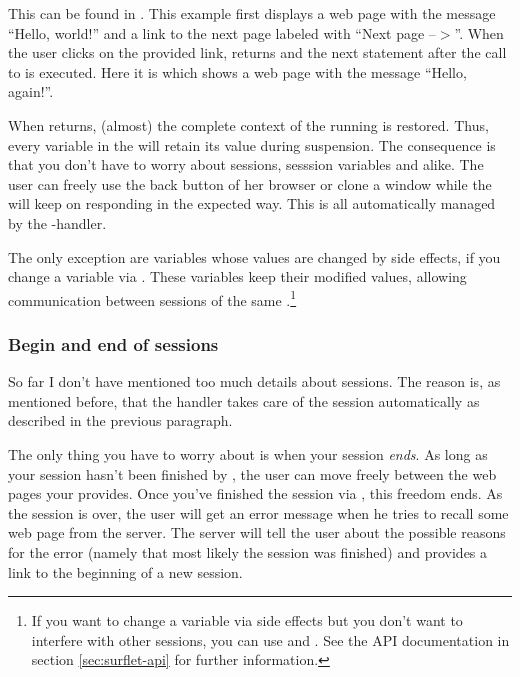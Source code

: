 This \surflet can be found in .  This
example first displays a web page with the message ``Hello, world!''
and a link to the next page labeled with ``Next page --$>$''.  When the
user clicks on the provided link,  returns and
the next statement after the call to  is
executed.  Here it is  which shows a web page
with the message ``Hello, again!''.

When  returns, (almost) the complete context
of the running \surflet is restored.  Thus, every variable in the
\surflet will retain its value during suspension.  The consequence is
that you don't have to worry about sessions, sesssion variables and
alike.  The user can freely use the back button of her browser or
clone a window while the \surflet will keep on responding in the
expected way.  This is all automatically managed by the
\surflet-handler.  

The only exception are variables whose values are changed by side
effects, \eg if you change a variable via .  These
variables keep their modified values, allowing communication between
sessions of the same \surflet.\footnote{If you want to change a
variable via side effects but you don't want to interfere with other
sessions, you can use  and
.  See the API documentation in section
\ref{sec:surflet-api} for further information.}


\subsubsection{Begin and end of sessions}

So far I don't have mentioned too much details about sessions.  The
reason is, as mentioned before, that the \surflet handler takes care
of the session automatically as described in the previous paragraph.

The only thing you have to worry about is when your session
\emph{ends}.  As long as your session hasn't been finished by
, the user can move freely between the web
pages your \surflet provides.  Once you've finished the session via
, this freedom ends.  As the session is over,
the user will get an error message when he tries to recall some web
page from the server.  The server will tell the user about the
possible reasons for the error (namely that most likely the session
was finished) and provides a link to the beginning of a new session.

